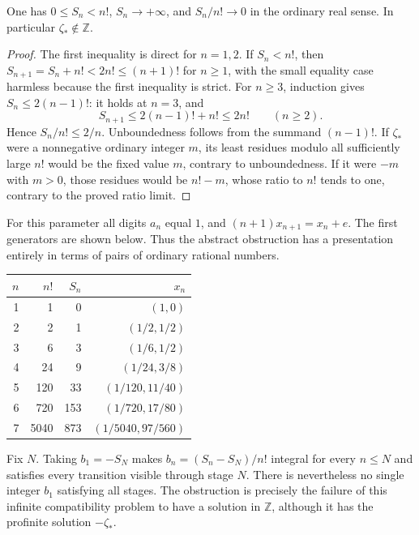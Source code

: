 \documentclass[11pt]{article}
\theoremstyle{definition}
\theoremstyle{remark}
\newcommand{\Z}{\mathbb{Z}}
\begin{document}
\begin{lemma}\label{isg:cf:lem:noninteger}
One has $0\le S_n<n!$, $S_n\to+\infty$, and $S_n/n!\to0$ in the
ordinary real sense. In particular $\zeta_*\notin\Z$.
\end{lemma}
\begin{proof}
The first inequality is direct for $n=1,2$. If $S_n<n!$, then
$S_{n+1}=S_n+n!<2n!\le(n+1)!$ for $n\ge1$, with the small equality
case harmless because the first inequality is strict.
For $n\ge3$, induction gives
$S_n\le2(n-1)!$: it holds at $n=3$, and
\[
 S_{n+1}\le2(n-1)!+n!\le2n!\qquad(n\ge2).
\]
Hence $S_n/n!\le2/n$. Unboundedness follows from the summand
$(n-1)!$.
If $\zeta_*$ were a nonnegative ordinary integer $m$, its least
residues modulo all sufficiently large $n!$ would be the fixed value
$m$, contrary to unboundedness. If it were $-m$ with $m>0$, those
residues would be $n!-m$, whose ratio to $n!$ tends to one, contrary to
the proved ratio limit.
\end{proof}

For this parameter all digits $a_n$ equal $1$, and $(n+1)x_{n+1}=x_n+e$.
The first generators are shown below. Thus the abstract obstruction has a
presentation entirely in terms of pairs of ordinary rational numbers.
\begin{center}\small
\begin{tabular}{rrrr}
\toprule
$n$ & $n!$ & $S_n$ & $x_n$\\
\midrule
1&1&0&$(1,0)$\\
2&2&1&$(1/2,1/2)$\\
3&6&3&$(1/6,1/2)$\\
4&24&9&$(1/24,3/8)$\\
5&120&33&$(1/120,11/40)$\\
6&720&153&$(1/720,17/80)$\\
7&5040&873&$(1/5040,97/560)$\\
\bottomrule
\end{tabular}
\end{center}

\begin{remark}\label{isg:cf:rem:finite}
Fix $N$. Taking $b_1=-S_N$ makes
$b_n=(S_n-S_N)/n!$ integral for every $n\le N$ and satisfies every
transition visible through stage $N$. There is nevertheless no single
integer $b_1$ satisfying all stages. The obstruction is precisely the
failure of this infinite compatibility problem to have a solution in
$\Z$, although it has the profinite solution $-\zeta_*$.
\end{remark}
\end{document}
